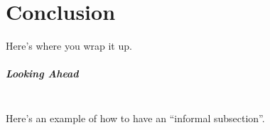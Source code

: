 \chapter[Conclusion][Conclusion]{Conclusion}

Here's where you wrap it up.

\paragraph*{Looking Ahead} \hspace{0pt} \\

Here's an example of how to have an ``informal subsection''.
